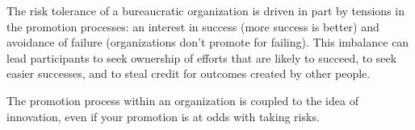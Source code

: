 The risk tolerance of a bureaucratic organization is driven in part by tensions in the promotion processes: an interest in success (more success is better) and avoidance of failure (organizations don't promote for failing). This imbalance can lead participants to seek ownership of efforts that are likely to succeed, to seek easier successes, and to steal credit for outcomes created by other people. 


The promotion process within an organization is coupled to the idea of innovation, even if your promotion is at odds with taking risks. 

